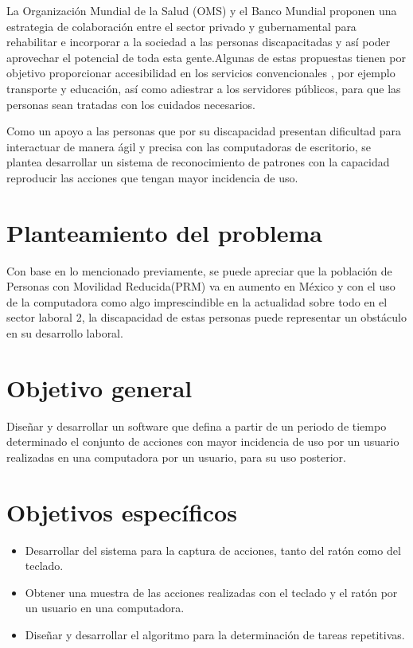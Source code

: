 
 
La Organización Mundial de la Salud (OMS) y el Banco Mundial
\cite{OrganizacionMundialdelaSalud2011} proponen una
 estrategia de colaboración entre el sector privado y gubernamental para
 rehabilitar e incorporar a la sociedad a las personas discapacitadas y así
 poder aprovechar el potencial de toda esta gente.Algunas de estas propuestas
 tienen por objetivo proporcionar accesibilidad en los servicios convencionales
 , por ejemplo transporte y educación, así como adiestrar a los servidores
 públicos, para que las personas sean tratadas con los cuidados necesarios.
 
 
Como un apoyo a las personas que por su discapacidad presentan dificultad para
 interactuar de manera ágil y precisa con las computadoras de escritorio, se
 plantea desarrollar un sistema de reconocimiento de patrones con la capacidad
 reproducir las acciones que tengan mayor incidencia de uso.

\section{Planteamiento del problema}
Con base en lo mencionado previamente, se puede apreciar que la población de
 Personas con Movilidad Reducida(PRM) va en aumento en México y con el uso de
 la computadora como algo imprescindible en la actualidad sobre todo en el
 sector laboral 2, la discapacidad de estas personas puede representar un
 obstáculo en su desarrollo laboral.



\section{Objetivo general} 
Diseñar y desarrollar un software que defina a partir de un periodo de tiempo
 determinado el conjunto de acciones con mayor incidencia de uso por un usuario
 realizadas en una computadora por un usuario, para su uso posterior.

\section{Objetivos específicos}
\begin{itemize}
  \item Desarrollar del sistema para la captura de acciones, tanto del  ratón
  como del teclado.
  \item Obtener una muestra de las acciones realizadas con el teclado y el 
  ratón por un usuario en una computadora.
  \item Diseñar y desarrollar el algoritmo para la determinación de tareas
  repetitivas.
\end{itemize}


